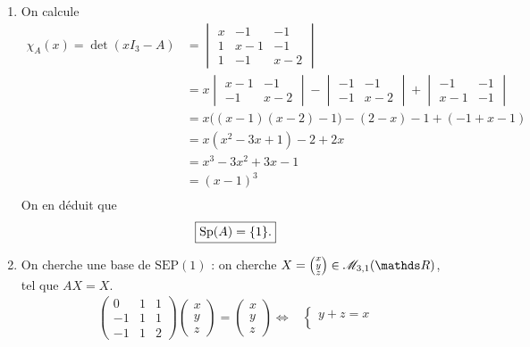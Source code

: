 \documentclass[a4paper]{article}
\begin{document}
	\begin{enumerate}
		\item On calcule
			\begin{align*}
				\chi_A(x) = \det(xI_3 - A) &=
				\begin{vmatrix}
					x & -1 & -1\\
					1 & x - 1 & -1\\
					1 & -1 & x - 2
				\end{vmatrix}\\
				&= x
				\begin{vmatrix}
					x-1&-1\\
					-1&x-2
				\end{vmatrix} -
				\begin{vmatrix}
					-1&-1\\
					-1&x-2
				\end{vmatrix} +
				\begin{vmatrix}
					-1&-1\\
					x-1&-1
				\end{vmatrix}\\
				&= x\big((x-1)(x-2) - 1\big) - (2-x) - 1  + (-1 + x - 1) \\
				&= x(x^2 -3x + 1) -2 + 2x \\
				&= x^3 - 3x^2 + 3x - 1 \\
				&= (x-1)^3 \\
			\end{align*}
			On en déduit que \[
				\boxed{\operatorname{Sp}(A) = \{1\}.}
			\]
		\item On cherche une base de $\mathrm{SEP}(1)$\/ : on cherche $X = \left( \substack{x\\y\\z} \right) \in \mathscr{M}_{3,1}(\R)$, tel que $AX = X$.
			\begin{align*}
				\begin{pmatrix}
					0&1&1\\
					-1&1&1\\
					-1&1&2
				\end{pmatrix} \begin{pmatrix}
					x\\y\\z
				\end{pmatrix} = \begin{pmatrix}
					x\\y\\z
				\end{pmatrix} \iff& \begin{cases}
					y + z = x\\

\end{cases}
\end{align*}
\end{enumerate}
\end{document}
